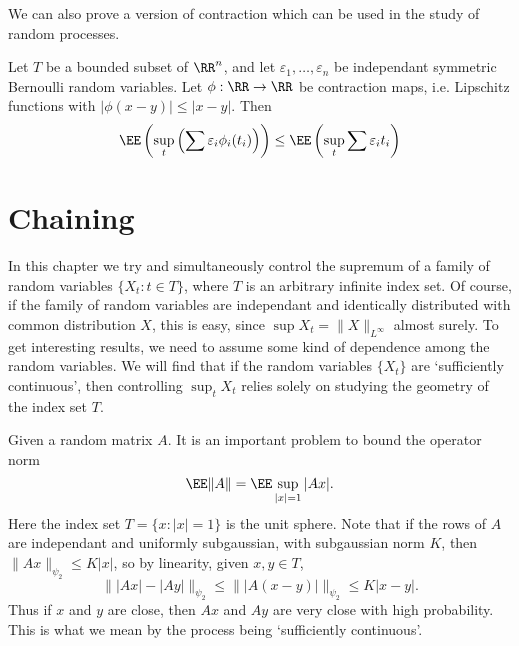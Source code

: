 We can also prove a version of contraction which can be used in the study of random processes.

\begin{theorem}
    Let $T$ be a bounded subset of $\RR^n$, and let $\varepsilon_1, \dots, \varepsilon_n$ be independant symmetric Bernoulli random variables. Let $\phi: \RR \to \RR$ be contraction maps, i.e. Lipschitz functions with $|\phi(x - y)| \leq |x - y|$. Then
    \[ \EE \left( \sup_t \left( \sum \varepsilon_i \phi_i(t_i) \right) \right) \leq \EE \left( \sup_t \sum \varepsilon_i t_i \right) \]
\end{theorem}











\chapter{Chaining}

In this chapter we try and simultaneously control the supremum of a family of random variables $\{ X_t : t \in T \}$, where $T$ is an arbitrary infinite index set. Of course, if the family of random variables are independant and identically distributed with common distribution $X$, this is easy, since $\sup X_t = \| X \|_{L^\infty}$ almost surely. To get interesting results, we need to assume some kind of dependence among the random variables. We will find that if the random variables $\{ X_t \}$ are `sufficiently continuous', then controlling $\sup_t X_t$ relies solely on studying the geometry of the index set $T$.

\begin{example}
	Given a random matrix $A$. It is an important problem to bound the operator norm
	\[ \EE \| A \| = \EE \sup_{|x| = 1} |Ax|. \]
	Here the index set $T = \{ x : |x| = 1 \}$ is the unit sphere. Note that if the rows of $A$ are independant and uniformly subgaussian, with subgaussian norm $K$, then $\| Ax \|_{\psi_2} \leq K |x|$, so by linearity, given $x,y \in T$,
	\[ \| |Ax| - |Ay| \|_{\psi_2} \leq \| |A(x-y)| \|_{\psi_2} \leq K |x - y|. \]
	Thus if $x$ and $y$ are close, then $Ax$ and $Ay$ are very close with high probability. This is what we mean by the process being `sufficiently continuous'.
\end{example}

